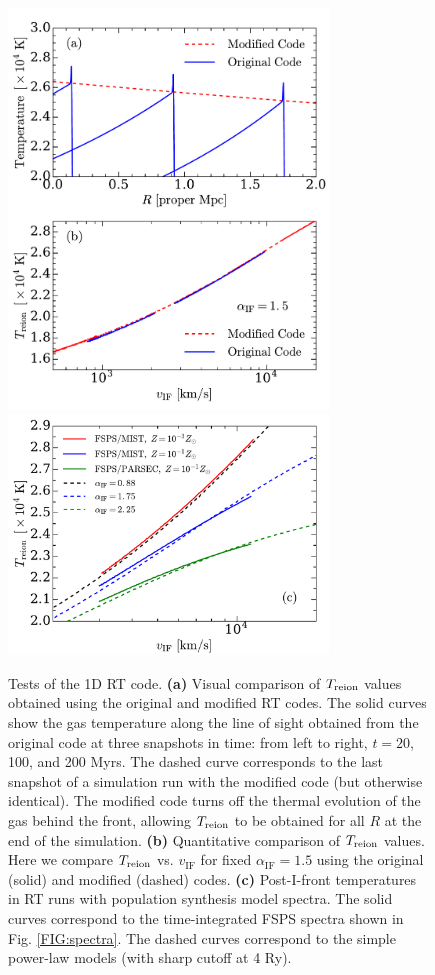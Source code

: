 \documentclass[twocolumn]{aastex62}
\newcommand{\Treion}{T_{\rm reion}}
\newcommand{\vIF}{v_{\mathrm{IF}}}
\newcommand{\spec}{\alpha_{\mathrm{IF}}}
\begin{document}
\begin{appendix}
\begin{figure}
\includegraphics[width=8.5cm]{fig13a.pdf}
\includegraphics[width=8.5cm]{fig13b.pdf}
\caption{ Tests of the 1D RT code. {\bf (a) } Visual comparison of $\Treion$ values obtained using the original and modified RT codes.  The solid curves show the gas temperature along the line of sight obtained from the original code at three snapshots in time: from left to right, $t=20$, 100, and 200 Myrs.  The dashed curve corresponds to the last snapshot of a simulation run with the modified code (but otherwise identical).  The modified code turns off the thermal evolution of the gas behind the front, allowing $\Treion$ to be obtained for all $R$ at the end of the simulation. {\bf (b) }  Quantitative comparison of $\Treion$ values.  Here we compare $\Treion$ vs. $\vIF$ for fixed $\spec=1.5$ using the original (solid) and modified (dashed) codes.    {\bf (c)} Post-I-front temperatures in RT runs with population synthesis model spectra. The solid curves correspond to the time-integrated FSPS spectra shown in Fig. \ref{FIG:spectra}.  The dashed curves correspond to the simple power-law models (with sharp cutoff at 4 Ry).}   
\label{fig:Treion_FSPS}
\end{figure}     


\end{appendix}
\end{document}
